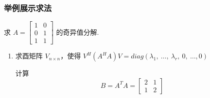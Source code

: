         \subsubsection{举例展示求法}
            \begin{problem}
                \par 求 $A = \begin{bmatrix}
                    1 & 0 \\ 0 & 1 \\ 1 & 1
                \end{bmatrix}$ 的奇异值分解.
            \end{problem}
            \begin{solution}
                \begin{enumerate}
                    \item 求酉矩阵 $V_{n \times n}$，使得 $V^H(A^HA)V = diag(\lambda_1, \ \dots, \ \lambda_r, \ 0, \ \dots, 0)$
                    \par 计算 
                        \begin{equation*}
                            B = A^TA = \begin{bmatrix}
                                2 & 1 \\ 1 & 2
                            \end{bmatrix}
                        \end{equation*}
                        

\end{enumerate}
\end{solution}
